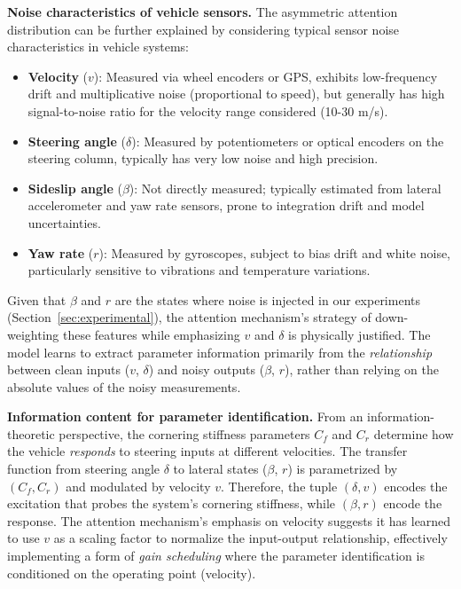\documentclass[Afour,sageh,times]{sagej}
\begin{document}
\textbf{Noise characteristics of vehicle sensors.} The asymmetric attention distribution can be further explained by considering typical sensor noise characteristics in vehicle systems:
\begin{itemize}
    \item \textbf{Velocity} ($v$): Measured via wheel encoders or GPS, exhibits low-frequency drift and multiplicative noise (proportional to speed), but generally has high signal-to-noise ratio for the velocity range considered (10-30 m/s).
    \item \textbf{Steering angle} ($\delta$): Measured by potentiometers or optical encoders on the steering column, typically has very low noise and high precision.
    \item \textbf{Sideslip angle} ($\beta$): Not directly measured; typically estimated from lateral accelerometer and yaw rate sensors, prone to integration drift and model uncertainties.
    \item \textbf{Yaw rate} ($r$): Measured by gyroscopes, subject to bias drift and white noise, particularly sensitive to vibrations and temperature variations.
\end{itemize}

Given that $\beta$ and $r$ are the states where noise is injected in our experiments (Section~\ref{sec:experimental}), the attention mechanism's strategy of down-weighting these features while emphasizing $v$ and $\delta$ is physically justified. The model learns to extract parameter information primarily from the \textit{relationship} between clean inputs ($v$, $\delta$) and noisy outputs ($\beta$, $r$), rather than relying on the absolute values of the noisy measurements.

\textbf{Information content for parameter identification.} From an information-theoretic perspective, the cornering stiffness parameters $C_f$ and $C_r$ determine how the vehicle \textit{responds} to steering inputs at different velocities. The transfer function from steering angle $\delta$ to lateral states ($\beta$, $r$) is parametrized by $(C_f, C_r)$ and modulated by velocity $v$. Therefore, the tuple $(\delta, v)$ encodes the excitation that probes the system's cornering stiffness, while $(\beta, r)$ encode the response. The attention mechanism's emphasis on velocity suggests it has learned to use $v$ as a scaling factor to normalize the input-output relationship, effectively implementing a form of \textit{gain scheduling} where the parameter identification is conditioned on the operating point (velocity).
\end{document}
